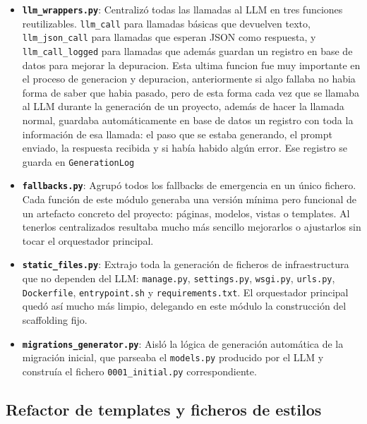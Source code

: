 \begin{itemize}
    \item \textbf{\texttt{llm\_wrappers.py}}: Centralizó todas las llamadas al LLM en tres funciones reutilizables. \texttt{llm\_call} para llamadas básicas que devuelven texto, \texttt{llm\_json\_call} para llamadas que esperan JSON como respuesta, y \texttt{llm\_call\_logged} para llamadas que además guardan un registro en base de datos para mejorar la depuracion. Esta ultima funcion fue muy importante en el proceso de generacion y depuracion, anteriormente si algo fallaba no habia forma de saber que habia pasado, pero de esta forma cada vez que se llamaba al LLM durante la generación de un proyecto, además de hacer la llamada normal, guardaba automáticamente en base de datos un registro con toda la información de esa llamada: el paso que se estaba generando, el prompt enviado, la respuesta recibida y si había habido algún error. Ese registro se guarda en \texttt{GenerationLog}
    
    \item \textbf{\texttt{fallbacks.py}}: Agrupó todos los fallbacks de emergencia en un único fichero. Cada función de este módulo generaba una versión mínima pero funcional de un artefacto concreto del proyecto: páginas, modelos, vistas o templates. Al tenerlos centralizados resultaba mucho más sencillo mejorarlos o ajustarlos sin tocar el orquestador principal.
    
    \item \textbf{\texttt{static\_files.py}}: Extrajo toda la generación de ficheros de infraestructura que no dependen del LLM: \texttt{manage.py}, \texttt{settings.py}, \texttt{wsgi.py}, \texttt{urls.py}, \texttt{Dockerfile}, \texttt{entrypoint.sh} y \texttt{requirements.txt}. El orquestador principal quedó así mucho más limpio, delegando en este módulo la construcción del scaffolding fijo.
    
    \item \textbf{\texttt{migrations\_generator.py}}: Aisló la lógica de generación automática de la migración inicial, que parseaba el \texttt{models.py} producido por el LLM y construía el fichero \texttt{0001\_initial.py} correspondiente.
\end{itemize}


\subsection{Refactor de templates y ficheros de estilos}
\label{subsec:refactor-templates-estilos}

